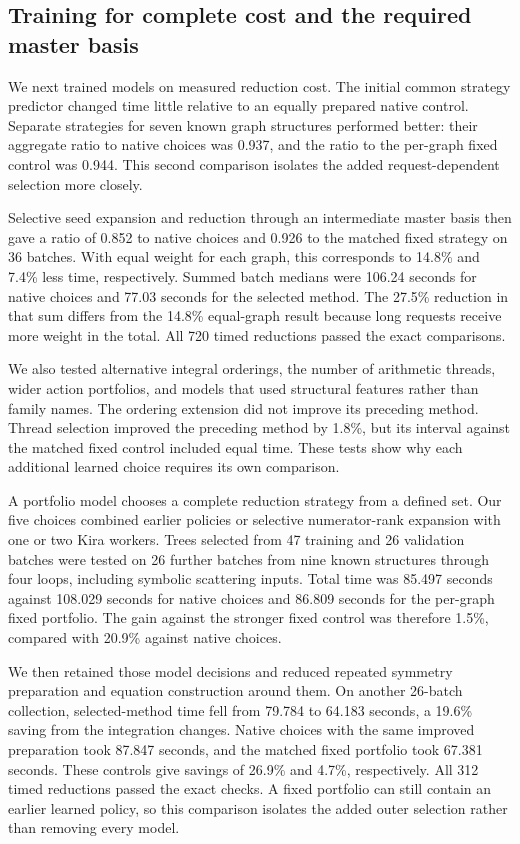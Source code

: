 \subsection{Training for complete cost and the required master basis}
We next trained models on measured reduction cost. The initial common strategy predictor changed time little relative to an equally prepared native control. Separate strategies for seven known graph structures performed better: their aggregate ratio to native choices was 0.937, and the ratio to the per-graph fixed control was 0.944. This second comparison isolates the added request-dependent selection more closely.

Selective seed expansion and reduction through an intermediate master basis then gave a ratio of 0.852 to native choices and 0.926 to the matched fixed strategy on 36 batches. With equal weight for each graph, this corresponds to 14.8\% and 7.4\% less time, respectively. Summed batch medians were 106.24 seconds for native choices and 77.03 seconds for the selected method. The 27.5\% reduction in that sum differs from the 14.8\% equal-graph result because long requests receive more weight in the total. All 720 timed reductions passed the exact comparisons.

We also tested alternative integral orderings, the number of arithmetic threads, wider action portfolios, and models that used structural features rather than family names. The ordering extension did not improve its preceding method. Thread selection improved the preceding method by 1.8\%, but its interval against the matched fixed control included equal time. These tests show why each additional learned choice requires its own comparison.

A portfolio model chooses a complete reduction strategy from a defined set. Our five choices combined earlier policies or selective numerator-rank expansion with one or two Kira workers. Trees selected from 47 training and 26 validation batches were tested on 26 further batches from nine known structures through four loops, including symbolic scattering inputs. Total time was 85.497 seconds against 108.029 seconds for native choices and 86.809 seconds for the per-graph fixed portfolio. The gain against the stronger fixed control was therefore 1.5\%, compared with 20.9\% against native choices.

We then retained those model decisions and reduced repeated symmetry preparation and equation construction around them. On another 26-batch collection, selected-method time fell from 79.784 to 64.183 seconds, a 19.6\% saving from the integration changes. Native choices with the same improved preparation took 87.847 seconds, and the matched fixed portfolio took 67.381 seconds. These controls give savings of 26.9\% and 4.7\%, respectively. All 312 timed reductions passed the exact checks. A fixed portfolio can still contain an earlier learned policy, so this comparison isolates the added outer selection rather than removing every model.

